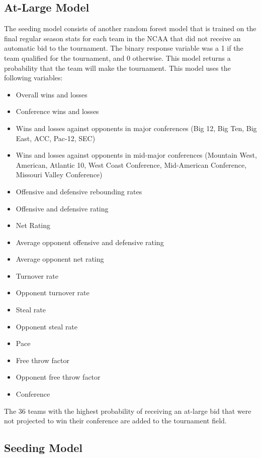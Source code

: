 \documentclass{article}
\begin{document}
\subsection{At-Large Model}

The seeding model consists of another random forest model that is trained on the final regular season stats for each team in the NCAA that did not receive an automatic bid to the tournament. The binary response variable was a 1 if the team qualified for the tournament, and 0 otherwise. This model returns a probability that the team will make the tournament. This model uses the following variables:

\begin{itemize}
	\item Overall wins and losses
	\item Conference wins and losses
	\item Wins and losses against opponents in major conferences (Big 12, Big Ten, Big East, ACC, Pac-12, SEC)
	\item Wins and losses against opponents in mid-major conferences (Mountain West, American, Atlantic 10, West Coast Conference, Mid-American Conference, Missouri Valley Conference)
	\item Offensive and defensive rebounding rates
	\item Offensive and defensive rating
	\item Net Rating
	\item Average opponent offensive and defensive rating
	\item Average opponent net rating
	\item Turnover rate
	\item Opponent turnover rate
	\item Steal rate
	\item Opponent steal rate
	\item Pace
	\item Free throw factor
	\item Opponent free throw factor
	\item Conference
\end{itemize}

The 36 teams with the highest probability of receiving an at-large bid that were not projected to win their conference are added to the tournament field.

\subsection{Seeding Model}
\end{document}
